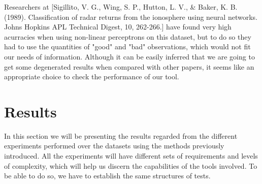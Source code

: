 \documentclass[12pt]{report}
\begin{document}
Researchers at [Sigillito, V. G., Wing, S. P., Hutton, L. V., \& Baker, K. B. (1989). Classification of radar returns from the ionosphere using neural networks. Johns Hopkins APL Technical Digest, 10, 262-266.] have found very high acurracies when using non-linear perceptrons on this dataset, but to do so they had to use the quantities of "good" and "bad" observations, which would not fit our needs of information. Although it can be easily inferred that we are going to get some degenerated results when compared with other papers, it seems like an appropriate choice to check the performance of our tool. \par 

\chapter{Results}

In this section we will be presenting the results regarded from the different experiments performed over the datasets using the methods previously introduced. All the experiments will have different sets of requirements and levels of complexity, which will help us discern the capabilities of the tools involved. To be able to do so, we have to establish the same structures of tests.
\end{document}
